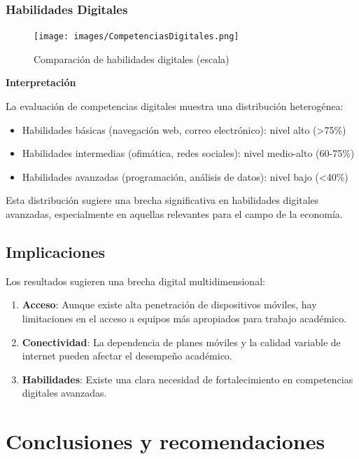 \documentclass[12pt, a4paper]{article}
\begin{document}
\subsubsection{Habilidades Digitales}

\begin{figure}[H]
    \begin{center}
        \texttt{[image: images/CompetenciasDigitales.png]}
    \end{center}
    \label{fig:CompetenciasDigitales}
    \caption{Comparación de habilidades digitales (escala)}
\end{figure}

\textbf{Interpretación}

La evaluación de competencias digitales muestra una distribución heterogénea:
\begin{itemize}
    \item Habilidades básicas (navegación web, correo electrónico): nivel alto (>75\%)
    \item Habilidades intermedias (ofimática, redes sociales): nivel medio-alto (60-75\%)
    \item Habilidades avanzadas (programación, análisis de datos): nivel bajo (<40\%)
\end{itemize}

Esta distribución sugiere una brecha significativa en habilidades digitales avanzadas, especialmente en aquellas relevantes para el campo de la economía.


\subsection{Implicaciones}
Los resultados sugieren una brecha digital multidimensional:
\begin{enumerate}
    \item \textbf{Acceso}: Aunque existe alta penetración de dispositivos móviles, hay limitaciones en el acceso a equipos más apropiados para trabajo académico.
    \item \textbf{Conectividad}: La dependencia de planes móviles y la calidad variable de internet pueden afectar el desempeño académico.
    \item \textbf{Habilidades}: Existe una clara necesidad de fortalecimiento en competencias digitales avanzadas.
\end{enumerate}

\section{Conclusiones y recomendaciones}
\end{document}
